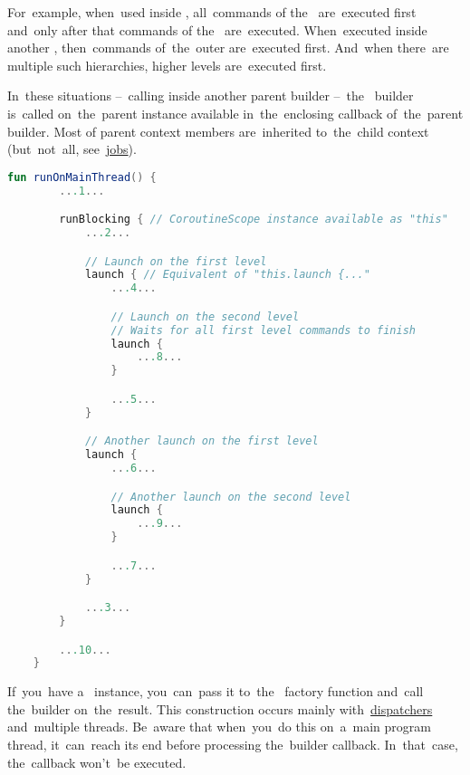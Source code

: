 For~example, when~used inside , all~commands of the~ are~executed first and~only after that commands of the~ are~executed.
When~executed inside another , then~commands of~the~outer  are~executed first.
And~when there~are multiple such  hierarchies, higher levels are~executed first.

In~these situations --~calling inside another parent builder --~the~ builder is~called on~the~parent  instance available in~the~enclosing callback of~the~parent builder.
Most of parent context members are~inherited to~the~child context (but~not~all, see~\hyperref[kotlincoroutinejob]{jobs}).

\enlargethispage{5mm}
\begin{lstlisting}[language=Kotlin, title={Numbers represent the~order of~execution}]
    fun runOnMainThread() {
        ...1...

        runBlocking { // CoroutineScope instance available as "this"
            ...2...

            // Launch on the first level
            launch { // Equivalent of "this.launch {..."
                ...4...

                // Launch on the second level
                // Waits for all first level commands to finish
                launch {
                    ...8...
                }

                ...5...
            }

            // Another launch on the first level
            launch {
                ...6...

                // Another launch on the second level
                launch {
                    ...9...
                }

                ...7...
            }

            ...3...
        }

        ...10...
    }
\end{lstlisting}
\newpage

\noindent If~you~have a~ instance, you~can~pass it to~the~ factory function and~call the~builder on~the~result.
This construction occurs mainly with~\hyperref[kotlincoroutinedispatcher]{dispatchers} and~multiple threads.
Be~aware that when~you~do this on~a~main program thread, it~can~reach its end before processing the~builder callback.
In~that~case, the~callback won't~be executed.

